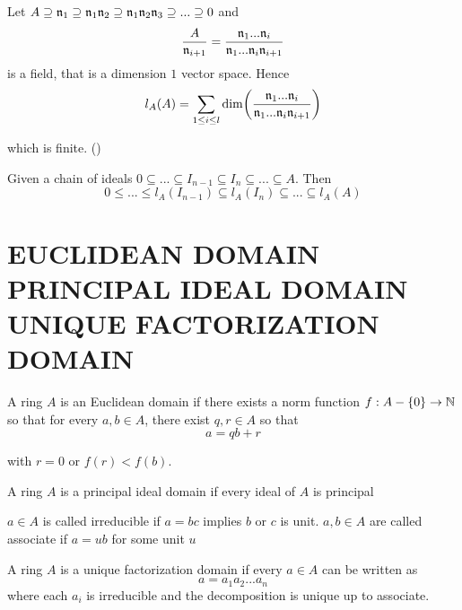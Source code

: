 \begin{remark}
	Let $A \supseteq \mathfrak{n}_1 \supseteq \mathfrak{n}_1 \mathfrak{n}_2 \supseteq \mathfrak{n}_1 \mathfrak{n}_2 \mathfrak{n}_3 \supseteq ... \supseteq 0$ and
	$$
		\frac{A}{\mathfrak{n}_{i+1}} = \frac{\mathfrak{n}_1 ... \mathfrak{n}_i}{\mathfrak{n}_1 ... \mathfrak{n}_i \mathfrak{n}_{i+1}}
	$$
	is a field, that is a dimension $1$ vector space. Hence
	$$
		l_A(A) = \sum_{1 \leq i \leq l} \dim \tuple*{\frac{\mf{n}_1 ... \mf{n}_i}{\mf{n}_1 ... \mf{n}_i \mf{n}_{i+1}}}
	$$
	
	which is finite. ()
\end{remark}

\begin{remark}
	Given a chain of ideals $0 \subseteq ... \subseteq I_{n-1} \subseteq I_n \subseteq ... \subseteq A$. Then
	$$
		0 \leq ... \leq l_A(I_{n-1}) \subseteq l_A(I_n) \subseteq ... \subseteq l_A(A)
	$$
\end{remark}

\section{EUCLIDEAN DOMAIN \\ PRINCIPAL IDEAL DOMAIN \\ UNIQUE FACTORIZATION DOMAIN}

\begin{definition}
	A ring $A$ is an Euclidean domain if there exists a norm function $f: A - \{0\} \to \mathbb{N}$ so that for every $a, b \in A$, there exist $q, r \in A$ so that
	$$
		a = qb + r
	$$
	
	with $r = 0$ or $f(r) < f(b)$.
\end{definition}

\begin{definition}
	A ring $A$ is a principal ideal domain if every ideal of $A$ is principal
\end{definition}

\begin{definition}
	$a \in A$ is called irreducible if $a = bc$ implies $b$ or $c$ is unit. $a, b \in A$ are called associate if $a = ub$ for some unit $u$
\end{definition}

\begin{definition}
	A ring $A$ is a unique factorization domain if every $a \in A$ can be written as
	$$
		a = a_1 a_2 ... a_n
	$$
	where each $a_i$ is irreducible and the decomposition is unique up to associate.
\end{definition}

